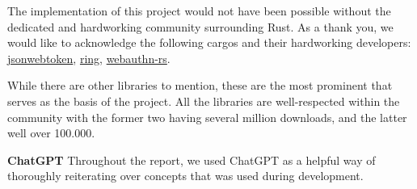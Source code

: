 The implementation of this project would not have been possible without the
dedicated and hardworking community surrounding Rust.
As a thank you, we would like to acknowledge the following cargos and their
hardworking developers:
\href{https://crates.io/crates/jsonwebtoken}{jsonwebtoken},
\href{https://crates.io/crates/ring}{ring},
\href{https://crates.io/crates/webauthn-rs}{webauthn-rs}.

While there are other libraries to mention, these are the most prominent that
serves as the basis of the project.
All the libraries are well-respected within the community with the former
two having several million downloads, and the latter well over 100.000.

\textbf{ChatGPT}
Throughout the report, we used ChatGPT as a helpful way of thoroughly
reiterating over concepts that was used during development.